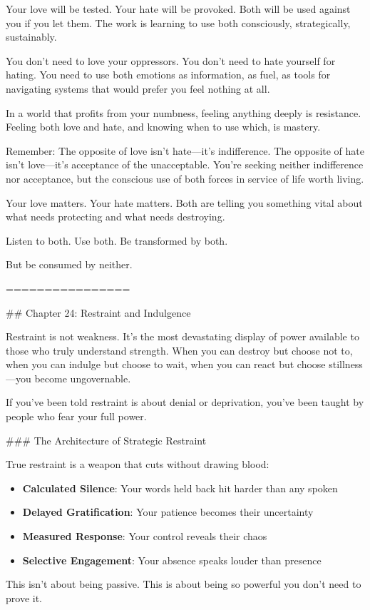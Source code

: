 \documentclass[12pt]{book}
\begin{document}
Your love will be tested. Your hate will be provoked. Both will be used against you if you let them. The work is learning to use both consciously, strategically, sustainably.

You don't need to love your oppressors. You don't need to hate yourself for hating. You need to use both emotions as information, as fuel, as tools for navigating systems that would prefer you feel nothing at all.

In a world that profits from your numbness, feeling anything deeply is resistance. Feeling both love and hate, and knowing when to use which, is mastery.

Remember: The opposite of love isn't hate—it's indifference. The opposite of hate isn't love—it's acceptance of the unacceptable. You're seeking neither indifference nor acceptance, but the conscious use of both forces in service of life worth living.

Your love matters. Your hate matters. Both are telling you something vital about what needs protecting and what needs destroying.

Listen to both. Use both. Be transformed by both.

But be consumed by neither.

================

\#\# Chapter 24: Restraint and Indulgence

Restraint is not weakness. It's the most devastating display of power available to those who truly understand strength. When you can destroy but choose not to, when you can indulge but choose to wait, when you can react but choose stillness—you become ungovernable.

If you've been told restraint is about denial or deprivation, you've been taught by people who fear your full power.

\#\#\# The Architecture of Strategic Restraint

True restraint is a weapon that cuts without drawing blood:

\begin{itemize}
\item \textbf{Calculated Silence}: Your words held back hit harder than any spoken
\item \textbf{Delayed Gratification}: Your patience becomes their uncertainty
\item \textbf{Measured Response}: Your control reveals their chaos
\item \textbf{Selective Engagement}: Your absence speaks louder than presence

\end{itemize}
This isn't about being passive. This is about being so powerful you don't need to prove it.
\end{document}
